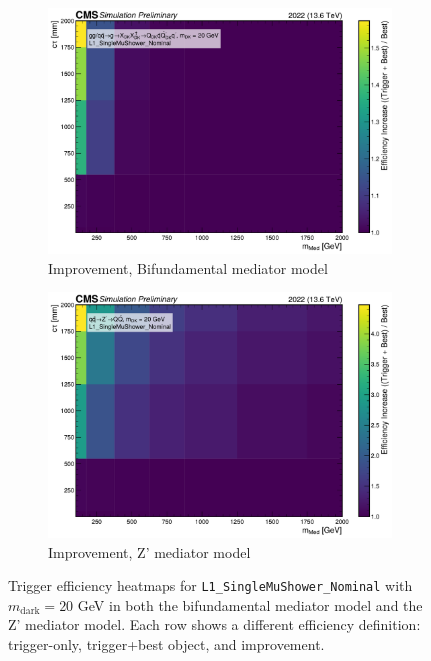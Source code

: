 \begin{figure}[h]
  \vspace{1em}

  \begin{subfigure}[t]{0.45\textwidth}
    \centering
    \includegraphics[width=\linewidth]{images/L1/llp_2D_tchan/trigeffplots2D_L1_efftype-improv_t-channel_mDark-20_L1_SingleMuShower_Nominal_study_cloppear.pdf}
    \caption{Improvement, Bifundamental mediator model}
    \label{fig:mus_improv_tchan}
  \end{subfigure}
  \hfill
  \begin{subfigure}[t]{0.45\textwidth}
    \centering
    \includegraphics[width=\linewidth]{images/L1/llp_2D_schan/trigeffplots2D_L1_efftype-improv_s-channel_mDark-20_L1_SingleMuShower_Nominal_study_cloppear.pdf}
    \caption{Improvement, Z' mediator model}
    \label{fig:mus_improv_schan}
  \end{subfigure}

  \caption{Trigger efficiency heatmaps for \texttt{L1\_SingleMuShower\_Nominal} with $m_\mathrm{dark} = 20$ GeV in both the bifundamental mediator model and the Z' mediator model. Each row shows a different efficiency definition: trigger-only, trigger+best object, and improvement.}
  \label{fig:mus_eff}
\end{figure}

